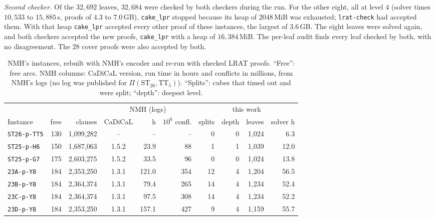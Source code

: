 \documentclass[11pt]{amsart}
\theoremstyle{definition}
\theoremstyle{remark}
\newcommand{\TT}[1]{\mathrm{TT}_{#1}}
\newcommand{\ST}[1]{\mathrm{ST}_{#1}}
\newcommand{\Piv}[2]{\Pi(#1,#2)}
\begin{document}
\emph{Second checker.} Of the $32{,}692$ leaves, $32{,}684$ were checked by both
checkers during the run. For the other eight, all at level $4$ (solver times
$10{,}533$ to $15{,}885$\,s, proofs of $4.3$ to $7.0$\,GB), \texttt{cake\_lpr}
stopped because its heap of $2048$\,MiB was exhausted; \texttt{lrat-check} had
accepted them. With that heap \texttt{cake\_lpr} accepted every other proof of
these instances, the largest of $3.6$\,GB. The eight leaves were solved again,
and both checkers accepted the new proofs, \texttt{cake\_lpr} with a heap of
$16{,}384$\,MiB. The per-leaf audit finds every leaf checked by both, with no
disagreement. The $28$ cover proofs were also accepted by both.

\begin{table}[ht]
\centering\small
\caption{NMH's instances, rebuilt with NMH's encoder and re-run with checked
LRAT proofs. ``Free'': free arcs. NMH columns: CaDiCaL version, run time in
hours and conflicts in millions, from NMH's logs (no log was published for
$\Piv{\ST{26}}{\TT{5}}$). ``Splits'': cubes that timed out and were split;
``depth'': deepest level.}
\label{tab:stage4}
\setlength{\tabcolsep}{3.5pt}
\begin{tabular}{@{}lrrcrrrrrr@{}}
\toprule
 & & & \multicolumn{3}{c}{NMH (logs)} & \multicolumn{4}{c}{this work} \\
\cmidrule(lr){4-6}\cmidrule(l){7-10}
Instance & free & clauses & CaDiCaL & h & $10^6$ confl. & splits & depth & leaves & solver h \\
\midrule
\texttt{ST26-p-TT5} & 130 & 1{,}099{,}282 & -- & -- & -- & 0 & 0 & 1{,}024 & 6.3 \\
\texttt{ST25-p-H6} & 150 & 1{,}687{,}063 & 1.5.2 & 23.9 & 88 & 1 & 1 & 1{,}039 & 12.0 \\
\texttt{ST25-p-G7} & 175 & 2{,}603{,}275 & 1.5.2 & 33.5 & 96 & 0 & 0 & 1{,}024 & 13.8 \\
\texttt{23A-p-Y8} & 184 & 2{,}353{,}250 & 1.3.1 & 121.0 & 354 & 12 & 4 & 1{,}204 & 56.5 \\
\texttt{23B-p-Y8} & 184 & 2{,}364{,}374 & 1.3.1 & 79.4 & 265 & 14 & 4 & 1{,}234 & 52.4 \\
\texttt{23C-p-Y8} & 184 & 2{,}364{,}374 & 1.3.1 & 97.5 & 308 & 14 & 4 & 1{,}234 & 52.2 \\
\texttt{23D-p-Y8} & 184 & 2{,}353{,}250 & 1.3.1 & 157.1 & 427 & 9 & 4 & 1{,}159 & 55.7 \\

\end{tabular}
\end{table}
\end{document}
